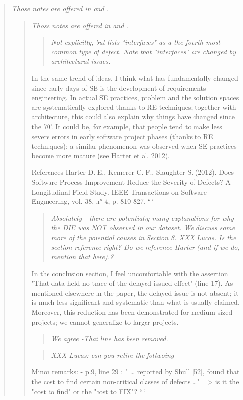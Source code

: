 \begin{quote}{\em 
Those notes are offered in  and .}
\begin{quote}{\em 
Those notes are offered in  and .}
\begin{quote}{\em
Not explicitly, but  lists "interfaces" as a the fourth most
common type of defect. Note that "interfaces" are changed by architectural
issues. }\end{quote}
 
In the same trend of ideas, I think what has
fundamentally changed since early days of SE is the
development of requirements engineering. In actual SE
practices, problem and the solution spaces are
systematically explored thanks to RE techniques; together
with architecture, this could also explain why things have
changed since the 70'. It could be, for example, that people
tend to make less severe errors in early software project
phases (thanks to RE techniques); a similar phenomenon was
observed when SE practices become more mature (see Harter et
al. 2012).  

References Harter D. E., Kemerer C. F., Slaughter S. (2012).
Does Software Process Improvement Reduce the Severity of
Defects? A Longitudinal Field Study. IEEE Transactions on
Software Engineering, vol. 38, n° 4, p. 810-827.
```

\begin{quote}{\em
  Absolutely - there are potentially many explanations for why the DIE was NOT observed in our dataset. We discuss some more of the potential causes in Section 8.
  XXX Lucas. Is the section reference right? Do we reference Harter (and if we do, mention that here).?
 }\end{quote}

 
In the conclusion section, I feel uncomfortable with
the assertion "That data held no trace of the delayed issued
effect" (line 17). As mentioned elsewhere in the paper, the
delayed issue is not absent; it is much less significant and
systematic than what is usually claimed. Moreover, this
reduction has been demonstrated for medium sized projects;
we cannot generalize to larger projects.  
\begin{quote}{\em
  We agree -That line has been removed.
 }\end{quote}


\begin{quote}{\em
 XXX Lucas: can you retire the follwoing
 }\end{quote}

Minor remarks: - p.9, line 29 : " … reported by Shull [52], found that the cost to find certain non-critical classes of defects …" => is it the "cost to find" or the "cost to FIX"?  
```


\end{quote}
\end{quote}
